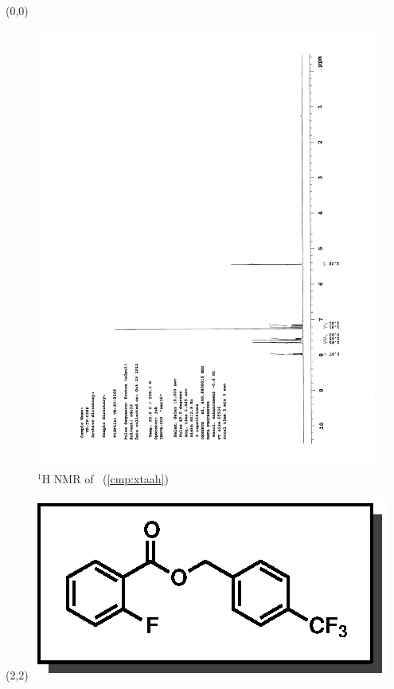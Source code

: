 \begin{textblock}{20}(0,0)
\begin{figure}[htb]
\caption{$^1$H NMR of \CMPxtaah\ (\ref{cmp:xtaah})}
\includegraphics[scale=0.75, trim = 0mm 0mm 0mm 5mm,
clip]{chp_asymmetric/images/nmr/xtaahH}
\vspace{-100pt}
\end{figure}
\end{textblock}
\begin{textblock}{1}(2,2)
\includegraphics[scale=0.8, angle=90]{chp_asymmetric/images/xtaah}
\end{textblock}
